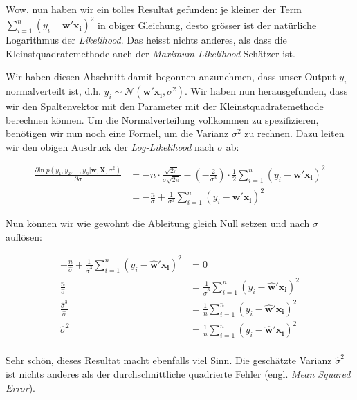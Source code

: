 \documentclass[
]{book}
\begin{document}
Wow, nun haben wir ein tolles Resultat gefunden: je kleiner der Term \(\sum_{i=1}^n \left(y_i - \mathbf{w}' \mathbf{x_i}\right)^{\!2}\) in obiger Gleichung, desto grösser ist der natürliche Logarithmus der \emph{Likelihood}. Das heisst nichts anderes, als dass die Kleinstquadratemethode auch der \emph{Maximum Likelihood} Schätzer ist.

Wir haben diesen Abschnitt damit begonnen anzunehmen, dass unser Output \(y_i\) normalverteilt ist, d.h. \(y_i \sim \mathcal{N}\left(\mathbf{w}' \mathbf{x_i}, \sigma^2\right)\). Wir haben nun herausgefunden, dass wir den Spaltenvektor mit den Parameter mit der Kleinstquadratemethode berechnen können. Um die Normalverteilung vollkommen zu spezifizieren, benötigen wir nun noch eine Formel, um die Varianz \(\sigma^2\) zu rechnen. Dazu leiten wir den obigen Ausdruck der \emph{Log-Likelihood} nach \(\sigma\) ab:

\begin{align}
\frac{\partial \text{ln}\; p(y_1,y_2,\dots,y_n|\mathbf{w},\mathbf{X},\sigma^2)}{\partial \sigma} &= -n\cdot \frac{\sqrt{2\pi}}{\sigma\sqrt{2\pi}} - (-\frac{2}{\sigma^3}) \cdot \frac{1}{2} \sum_{i=1}^n \left(y_i - \mathbf{w}' \mathbf{x_i}\right)^{\!2} \\
&= -\frac{n}{\sigma} + \frac{1}{\sigma^3} \sum_{i=1}^n \left(y_i - \mathbf{w}' \mathbf{x_i}\right)^{\!2}
\end{align}

Nun können wir wie gewohnt die Ableitung gleich Null setzen und nach \(\sigma\) auflösen:

\begin{align}
-\frac{n}{\hat{\sigma}} + \frac{1}{\hat{\sigma}^3} \sum_{i=1}^n \left(y_i - \mathbf{\hat{w}}' \mathbf{x_i}\right)^{\!2} &= 0 \\
\frac{n}{\hat{\sigma}} &= \frac{1}{\hat{\sigma}^3} \sum_{i=1}^n \left(y_i - \mathbf{\hat{w}}' \mathbf{x_i}\right)^{\!2} \\
\frac{\hat{\sigma}^3}{\hat{\sigma}} &= \frac{1}{n} \sum_{i=1}^n \left(y_i - \mathbf{\hat{w}}' \mathbf{x_i}\right)^{\!2} \\
\hat{\sigma}^2 &= \frac{1}{n} \sum_{i=1}^n \left(y_i - \mathbf{\hat{w}}' \mathbf{x_i}\right)^{\!2} \\
\end{align}

Sehr schön, dieses Resultat macht ebenfalls viel Sinn. Die geschätzte Varianz \(\hat{\sigma}^2\) ist nichts anderes als der durchschnittliche quadrierte Fehler (engl. \emph{Mean Squared Error}).
\end{document}
